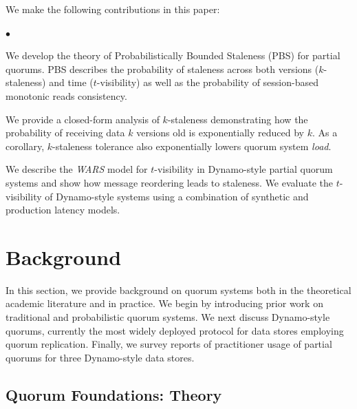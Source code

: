 \documentclass{vldb}
\newcommand{\sectionskip}{-0em}
\newcommand{\subsectionskip}{-0em}
\newenvironment{myitemize}
{
   \vspace{0mm}
    \begin{list}{$\bullet$ }{}
        \setlength{\topsep}{0em}
        \setlength{\parskip}{0pt}
        \setlength{\partopsep}{0pt}
        \setlength{\parsep}{0pt}         
        \setlength{\itemsep}{2.5mm} 
}
{
    \end{list} 
    \vspace{-1em}
}
\begin{document}
We make the following contributions in this paper:

\begin{myitemize}

\item We develop the theory of Probabilistically Bounded Staleness
  (PBS) for partial quorums. PBS describes the probability of
  staleness across both versions ($k$-staleness) and time
  ($t$-visibility) as well as the probability of session-based
  monotonic reads consistency.

\item We provide a closed-form analysis of $k$-staleness demonstrating
  how the probability of receiving data $k$ versions old is
  exponentially reduced by $k$.  As a corollary, $k$-staleness tolerance also
  exponentially lowers quorum system \textit{load}.

\item We describe the \textit{WARS} model for $t$-visibility in
  Dynamo-style partial quorum systems and show how message reordering
  leads to staleness.  We evaluate the $t$-visibility of Dynamo-style
  systems using a combination of synthetic and production latency
  models.

\end{myitemize}

\vspace{2em}

\vspace{\sectionskip}\section{Background}
\label{sec:background}

In this section, we provide background on quorum systems both
in the theoretical academic literature and in practice.  We begin by
introducing prior work on traditional and probabilistic quorum
systems.  We next discuss Dynamo-style quorums, currently the most
widely deployed protocol for data stores employing quorum replication.
Finally, we survey reports of practitioner usage of partial quorums
for three Dynamo-style data stores.

\vspace{\subsectionskip}\subsection{Quorum Foundations: Theory}
\end{document}
